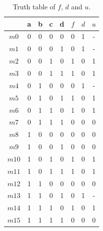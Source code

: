 \documentclass[a4paper, 10pt]{article}
\begin{document}
\begin{table}[hbtp]
    \centering
    \begin{tabular}{|c | c c c c | c c c |}
        \hline
            & a & b & c & d & $f$ & $d$ & $u$ \\ \hline
        $m0$  & 0 & 0 & 0 & 0 & 0 & 1 & - \\
        $m1$  & 0 & 0 & 0 & 1 & 0 & 1 & - \\
        $m2$  & 0 & 0 & 1 & 0 & 1 & 0 & 1 \\
        $m3$  & 0 & 0 & 1 & 1 & 1 & 0 & 1 \\
        $m4$  & 0 & 1 & 0 & 0 & 0 & 1 & - \\
        $m5$  & 0 & 1 & 0 & 1 & 1 & 0 & 1 \\
        $m6$  & 0 & 1 & 1 & 0 & 1 & 0 & 1 \\
        $m7$  & 0 & 1 & 1 & 1 & 0 & 0 & 0 \\
        $m8$  & 1 & 0 & 0 & 0 & 0 & 0 & 0 \\
        $m9$  & 1 & 0 & 0 & 1 & 0 & 0 & 0 \\
        $m10$ & 1 & 0 & 1 & 0 & 1 & 0 & 1 \\
        $m11$ & 1 & 0 & 1 & 1 & 1 & 0 & 1 \\
        $m12$ & 1 & 1 & 0 & 0 & 0 & 0 & 0 \\
        $m13$ & 1 & 1 & 0 & 1 & 0 & 1 & - \\
        $m14$ & 1 & 1 & 1 & 0 & 1 & 0 & 1 \\
        $m15$ & 1 & 1 & 1 & 1 & 0 & 0 & 0 \\ \hline
    \end{tabular}
    \caption{Truth table of $f$, $d$ and $u$.}
    \label{tab:truth_table}
\end{table}
\end{document}
